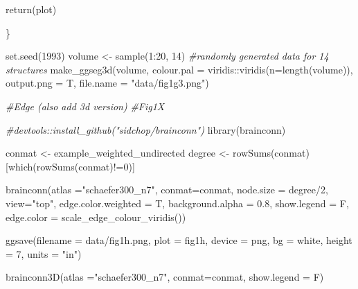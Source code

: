 \documentclass{article}
\newenvironment{Shaded}{\begin{snugshade}}{\end{snugshade}}
\newcommand{\AttributeTok}[1]{\textcolor[rgb]{0.77,0.63,0.00}{#1}}
\newcommand{\CommentTok}[1]{\textcolor[rgb]{0.56,0.35,0.01}{\textit{#1}}}
\newcommand{\DecValTok}[1]{\textcolor[rgb]{0.00,0.00,0.81}{#1}}
\newcommand{\FloatTok}[1]{\textcolor[rgb]{0.00,0.00,0.81}{#1}}
\newcommand{\FunctionTok}[1]{\textcolor[rgb]{0.00,0.00,0.00}{#1}}
\newcommand{\NormalTok}[1]{#1}
\newcommand{\OtherTok}[1]{\textcolor[rgb]{0.56,0.35,0.01}{#1}}
\newcommand{\SpecialCharTok}[1]{\textcolor[rgb]{0.00,0.00,0.00}{#1}}
\newcommand{\StringTok}[1]{\textcolor[rgb]{0.31,0.60,0.02}{#1}}
\begin{document}
\begin{Shaded}
\begin{Highlighting}[]
  \FunctionTok{return}\NormalTok{(plot)}
  
\NormalTok{\}}

\FunctionTok{set.seed}\NormalTok{(}\DecValTok{1993}\NormalTok{)}
\NormalTok{volume }\OtherTok{\textless{}{-}} \FunctionTok{sample}\NormalTok{(}\DecValTok{1}\SpecialCharTok{:}\DecValTok{20}\NormalTok{, }\DecValTok{14}\NormalTok{) }\CommentTok{\#randomly generated data for 14 structures}
\FunctionTok{make\_ggseg3d}\NormalTok{(volume, }
             \AttributeTok{colour.pal =}\NormalTok{ viridis}\SpecialCharTok{::}\FunctionTok{viridis}\NormalTok{(}\AttributeTok{n=}\FunctionTok{length}\NormalTok{(volume)), }
             \AttributeTok{output.png =}\NormalTok{ T, }\AttributeTok{file.name =} \StringTok{"data/fig1g3.png"}\NormalTok{)}
\end{Highlighting}
\end{Shaded}

\begin{Shaded}
\begin{Highlighting}[]
\CommentTok{\#Edge (also add 3d version)}
\CommentTok{\#Fig1X}

\CommentTok{\#devtools::install\_github("sidchop/brainconn")}
\FunctionTok{library}\NormalTok{(brainconn)}

\NormalTok{conmat }\OtherTok{\textless{}{-}}\NormalTok{ example\_weighted\_undirected}
\NormalTok{degree }\OtherTok{\textless{}{-}} \FunctionTok{rowSums}\NormalTok{(conmat)[}\FunctionTok{which}\NormalTok{(}\FunctionTok{rowSums}\NormalTok{(conmat)}\SpecialCharTok{!=}\DecValTok{0}\NormalTok{)]}

\FunctionTok{brainconn}\NormalTok{(}\AttributeTok{atlas =}\StringTok{"schaefer300\_n7"}\NormalTok{, }
                   \AttributeTok{conmat=}\NormalTok{conmat, }
                   \AttributeTok{node.size =}\NormalTok{ degree}\SpecialCharTok{/}\DecValTok{2}\NormalTok{,}
                   \AttributeTok{view=}\StringTok{"top"}\NormalTok{, }
                   \AttributeTok{edge.color.weighted =}\NormalTok{ T,}
                   \AttributeTok{background.alpha =} \FloatTok{0.8}\NormalTok{, }
                   \AttributeTok{show.legend =}\NormalTok{ F, }
                   \AttributeTok{edge.color =} \FunctionTok{scale\_edge\_colour\_viridis}\NormalTok{()) }



\FunctionTok{ggsave}\NormalTok{(}\AttributeTok{filename =} \StringTok{\textquotesingle{}data/fig1h.png\textquotesingle{}}\NormalTok{, }
       \AttributeTok{plot =}\NormalTok{ fig1h, }
       \AttributeTok{device =} \StringTok{\textquotesingle{}png\textquotesingle{}}\NormalTok{,}
       \AttributeTok{bg =} \StringTok{\textquotesingle{}white\textquotesingle{}}\NormalTok{,}
       \AttributeTok{height =} \DecValTok{7}\NormalTok{, }
       \AttributeTok{units =} \StringTok{"in"}\NormalTok{)}


\FunctionTok{brainconn3D}\NormalTok{(}\AttributeTok{atlas =}\StringTok{"schaefer300\_n7"}\NormalTok{, }
            \AttributeTok{conmat=}\NormalTok{conmat,}
            \AttributeTok{show.legend =}\NormalTok{ F)}
\end{Highlighting}
\end{Shaded}




\end{document}
